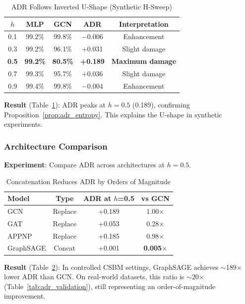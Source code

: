 \begin{table}[t]
\centering
\caption{ADR Follows Inverted U-Shape (Synthetic H-Sweep)}
\label{tab:adr_hsweep}
\begin{tabular}{@{}ccccc@{}}
\toprule
\textbf{$h$} & \textbf{MLP} & \textbf{GCN} & \textbf{ADR} & \textbf{Interpretation} \\
\midrule
0.1 & 99.2\% & 99.8\% & $-0.006$ & Enhancement \\
0.3 & 99.2\% & 96.1\% & +0.031 & Slight damage \\
\textbf{0.5} & \textbf{99.2\%} & \textbf{80.5\%} & \textbf{+0.189} & \textbf{Maximum damage} \\
0.7 & 99.3\% & 95.7\% & +0.036 & Slight damage \\
0.9 & 99.4\% & 99.8\% & $-0.004$ & Enhancement \\
\bottomrule
\end{tabular}
\end{table}

\textbf{Result} (Table~\ref{tab:adr_hsweep}): ADR peaks at $h=0.5$ (0.189), confirming Proposition~\ref{prop:adr_entropy}. This explains the U-shape in synthetic experiments.

\subsubsection{Architecture Comparison}

\textbf{Experiment}: Compare ADR across architectures at $h=0.5$.

\begin{table}[t]
\centering
\caption{Concatenation Reduces ADR by Orders of Magnitude}
\label{tab:adr_architecture_exp}
\begin{tabular}{@{}lccc@{}}
\toprule
\textbf{Model} & \textbf{Type} & \textbf{ADR at $h$=0.5} & \textbf{vs GCN} \\
\midrule
GCN & Replace & +0.189 & 1.00$\times$ \\
GAT & Replace & +0.053 & 0.28$\times$ \\
APPNP & Replace & +0.185 & 0.98$\times$ \\
\midrule
GraphSAGE & Concat & +0.001 & \textbf{0.005$\times$} \\
\bottomrule
\end{tabular}
\end{table}

\textbf{Result} (Table~\ref{tab:adr_architecture_exp}): In controlled CSBM settings, GraphSAGE achieves $\sim$189$\times$ lower ADR than GCN. On real-world datasets, this ratio is $\sim$20$\times$ (Table~\ref{tab:adr_validation}), still representing an order-of-magnitude improvement.

